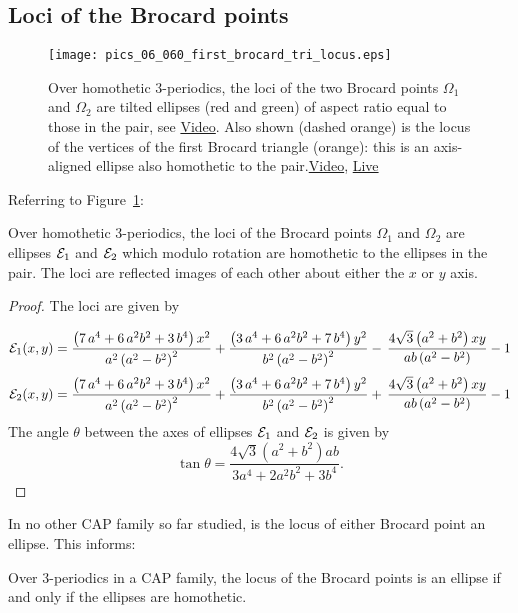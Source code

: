 \subsection{Loci of the Brocard points}

\begin{figure}
    \centering
\texttt{[image: pics\_06\_060\_first\_brocard\_tri\_locus.eps]}
\caption{Over homothetic 3-periodics, the loci of the two Brocard points $\Omega_1$ and $\Omega_2$ are tilted ellipses (red and green) of aspect ratio equal to those in the pair, see \href{https://youtu.be/2fvGd8wioZY}{Video}. Also shown (dashed orange) is the locus of the vertices of the first Brocard triangle (orange): this is an axis-aligned ellipse also homothetic to the pair.\href{https://youtu.be/13i3JGY-fK4}{Video}, \href{https://bit.ly/3iaISog}{Live}}
\label{fig:06-homot-loci}
\end{figure}

Referring to Figure~\ref{fig:06-homot-loci}:

\begin{proposition}
Over homothetic 3-periodics, the loci of the Brocard points $\Omega_1$ and $\Omega_2$ are ellipses $\mathcal{E}_1$ and $\mathcal{E}_2$ which modulo rotation are homothetic to the ellipses in the pair. The loci are reflected images of each other about either the $x$ or $y$ axis.
\end{proposition}

\begin{proof}
The loci are given by
	
	\[\mathcal{E}_1(x,y)= {\frac { \left( 7\,{a}^{4}+6\,{a}^{2}{b}^{2}+3\,{b}^{4} \right) {x}^{2
}}{{a}^{2} \left( a^2-b^2 \right) ^{2}   }}+{\frac {
 \left( 3\,{a}^{4}+6\,{a}^{2}{b}^{2}+7\,{b}^{4} \right) {y}^{2}}{{b}^{
2} \left( {a}^{2}-  {b}^{2} \right)^2 }}- \,{\frac {
4\sqrt {3} \left( {a}^{2}+{b}^{2} \right) xy}{ab \left( {a}^{2}-{b}^{2}
 \right) }}-1
	\]
	\[\mathcal{E}_2(x,y)=	 {\frac { \left( 7\,{a}^{4}+6\,{a}^{2}{b}^{2}+3\,{b}^{4} \right) {x}^{2
}}{{a}^{2} \left( a^2-b^2 \right) ^{2}   }}+{\frac {
 \left( 3\,{a}^{4}+6\,{a}^{2}{b}^{2}+7\,{b}^{4} \right) {y}^{2}}{{b}^{
2} \left( {a}^{2}- {b}^{2} \right)^2 }}+ \,{\frac {
4\sqrt {3} \left( {a}^{2}+{b}^{2} \right) xy}{ab \left( {a}^{2}-{b}^{2}
 \right) }}-1
\]	
	The angle $\theta$ between the axes of ellipses $\mathcal{E}_1$  and $\mathcal{E}_2$ is given by
	\[\tan\theta = \frac{4\sqrt{3}(a^2+b^2) ab}{3a^4+2a^2b^2+3b^4}.\]
\end{proof}

In no other CAP family so far studied, is the locus of either Brocard point an ellipse. This informs:

\begin{conjecture}
Over 3-periodics in a CAP family, the locus of the Brocard points is an ellipse if and only if the ellipses are homothetic.
\label{conj:06-homoth-broc-loci}
\end{conjecture}

